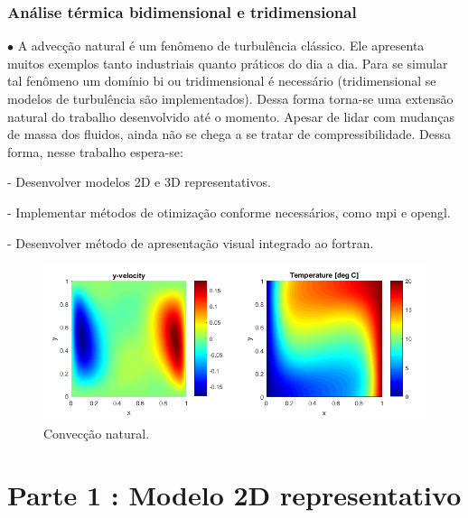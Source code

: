 \documentclass[xcolor=dvipsnames,10pt,aspectratio=169]{beamer}
\begin{document}
	
		\begin{frame}
		\frametitle{Análise térmica bidimensional e tridimensional}
			$\bullet$ A advecção natural é um fenômeno de turbulência clássico. Ele apresenta muitos exemplos tanto industriais quanto práticos do dia a dia. 
			Para se simular tal fenômeno um domínio bi ou tridimensional é necessário (tridimensional se modelos de turbulência são implementados). Dessa forma torna-se uma extensão natural do trabalho desenvolvido até o momento. Apesar de lidar com mudanças de massa dos fluidos, ainda não se chega a se tratar de compressibilidade. Dessa forma, nesse trabalho espera-se:
			
			- Desenvolver modelos 2D e 3D representativos.
			
			- Implementar métodos de otimização conforme necessários, como mpi e opengl.
			
			- Desenvolver método de apresentação visual integrado ao fortran. 
			
				\begin{figure}[h!]
				\centering
				\includegraphics[trim = {1.7cm 2cm 0 1cm}, clip , angle=0, scale=0.50]{NaturalConvectionFromNet}
				\caption{Convecção natural.}
				\end{figure}

		\end{frame}





	\section{Parte 1 : Modelo 2D representativo}
	
\end{document}

